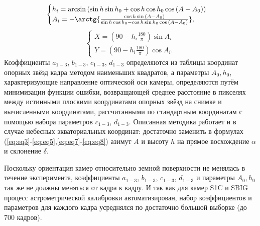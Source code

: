 \documentclass[12pt,a4paper]{article}
\begin{document}
\begin{equation}\label{eq:eq9_dop}
\begin{cases}
h_i=\arcsin{(\sin{h}\sin{h_0}+\cos{h}\cos{h_0}\cos{(A-A_0)})}\\
A_i=-\arctg{\frac
	{\cos{h}\sin{(A-A_0)}}
	{\sin{h}\cos{h_0}-\cos{h}\sin{h_0}\cos{(A-A_0)}}},
\end{cases}
\end{equation}
\begin{equation}\label{eq:eq10_dop}
\begin{cases}
X= (90-h_i\frac{180}{\pi})\sin{A_i}\\
Y= (90-h_i\frac{180}{\pi})\cos{A_i}.
\end{cases}
\end{equation}
Коэффициенты $a_{1-3}$, $b_{1-3}$, $c_{1-3}$, $d_{1-3}$ определяются из таблицы координат опорных звёзд кадра методом наименьших квадратов, а параметры $A_0, h_0$, характеризующие направление оптической оси камеры, определяются путём минимизации функции ошибки, возвращающей среднее расстояние в пикселях между истинными плоскими координатами опорных звёзд на снимке и вычисленными координатами, рассчитанными по стандартным координатам с помощью набора параметров $c_{1-3}$, $d_{1-3}$.
Описанная методика работает и в случае небесных экваториальных координат: достаточно заменить в формулах (\ref{eq:eq3}-\ref{eq:eq5},\ref{eq:eq7}-\ref{eq:eq8}) азимут $A$ и высоту $h$ на прямое восхождение $\alpha$ и склонение $\delta$.

Поскольку ориентация камер относительно земной поверхности не менялась в течение эксперимента, коэффициенты $a_{1-3}$, $b_{1-3}$, $c_{1-3}$, $d_{1-3}$ и параметры $A_0, h_0$ так же не должны меняться от кадра к кадру. И так как для камер S1C и SBIG процесс астрометрической калибровки автоматизирован, набор коэффициентов и параметров для каждого кадра усреднялся по достаточно большой выборке (до 700 кадров).
\end{document}
